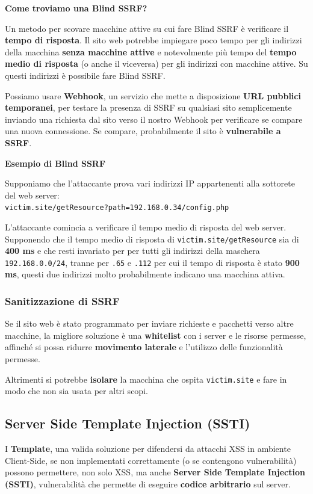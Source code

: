 \documentclass{article}
\begin{document}
\textbf{Come troviamo una Blind SSRF?}

Un metodo per scovare macchine attive su cui fare Blind SSRF è verificare il \textbf{tempo di risposta}. Il sito web potrebbe impiegare poco tempo per gli indirizzi della macchina \textbf{senza macchine attive} e notevolmente più tempo del \textbf{tempo medio di risposta} (o anche il viceversa) per gli indirizzi con macchine attive. Su questi indirizzi è possibile fare Blind SSRF. 

Possiamo usare \textbf{Webhook}, un servizio che mette a disposizione \textbf{URL pubblici temporanei}, per testare la presenza di SSRF su qualsiasi sito semplicemente inviando una richiesta dal sito verso il nostro Webhook per verificare se compare una nuova connessione. Se compare, probabilmente il sito è \textbf{vulnerabile a SSRF}.

\textbf{Esempio di Blind SSRF}

Supponiamo che l'attaccante prova vari indirizzi IP appartenenti alla sottorete del web server:\\ \verb|victim.site/getResource?path=192.168.0.34/config.php|

L'attaccante comincia a verificare il tempo medio di risposta del web server. Supponendo che il tempo medio di risposta di \verb|victim.site/getResource| sia di \textbf{400 ms} e che resti invariato per per tutti gli indirizzi della maschera
\verb|192.168.0.0/24|, tranne per \verb|.65| e \verb|.112| per cui il tempo di risposta è stato \textbf{900 ms}, questi due indirizzi molto probabilmente indicano una macchina attiva.

\subsubsection{Sanitizzazione di SSRF}
Se il sito web è stato programmato per inviare richieste e pacchetti verso altre macchine, la migliore soluzione è una \textbf{whitelist} con i server e le risorse permesse, affinché si possa ridurre \textbf{movimento laterale} e l'utilizzo delle funzionalità permesse.

Altrimenti si potrebbe \textbf{isolare} la macchina che ospita \verb|victim.site| e fare in modo che non sia usata per altri scopi.

\subsection{Server Side Template Injection (SSTI)}
I \textbf{Template}, una valida soluzione per difendersi da attacchi XSS in ambiente Client-Side, se non implementati correttamente (o se contengono vulnerabilità) possono permettere, non solo XSS, ma anche \textbf{Server Side Template Injection (SSTI)}, vulnerabilità che permette di eseguire \textbf{codice arbitrario} sul server.
\end{document}

